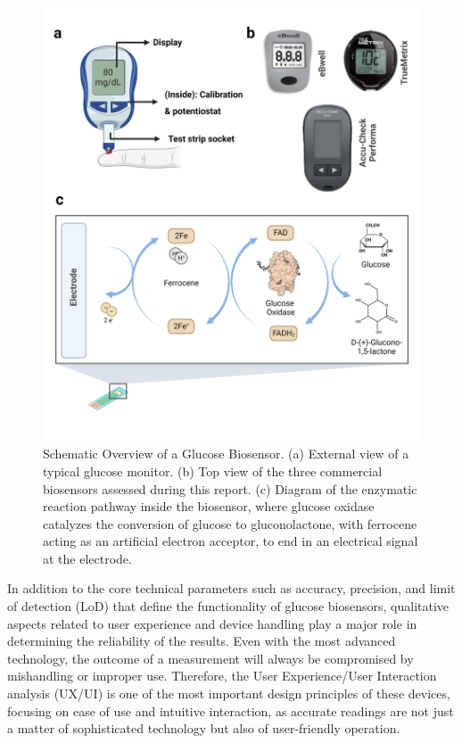 \documentclass[conference]{IEEEtran}
\begin{document}
\begin{figure}[h]
   \centering
   \includegraphics[width=1\linewidth]{images/initial diagram.png}
   \caption{Schematic Overview of a Glucose Biosensor. 
   (a) External view of a typical glucose monitor. (b) Top view of the three commercial biosensors assessed during this report.
   (c) Diagram of the enzymatic reaction pathway inside the biosensor, where glucose oxidase 
    catalyzes the conversion of glucose to gluconolactone, with ferrocene acting as an artificial 
    electron acceptor, to end in an electrical signal at the electrode.}
   \label{fig:initialdiagram}
\end{figure}

In addition to the core technical parameters such as accuracy, precision, and limit of detection (LoD) that define the functionality of 
glucose biosensors, qualitative aspects related to user experience and device handling play a major role in determining the reliability 
of the results. Even with the most advanced technology, the outcome of a measurement will always be compromised by mishandling or improper use. 
Therefore, the User Experience/User Interaction analysis (UX/UI) is one of the most important design principles of these devices, focusing on ease 
of use and intuitive interaction, as accurate readings are not just a matter of sophisticated technology but also of user-friendly operation.
\end{document}
